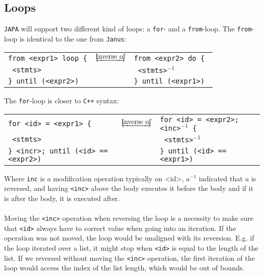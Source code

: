 \subsection{Loops}
\texttt{JAPA} will support two different kind of loops: a \texttt{for}- and a \texttt{from}-loop.
The \texttt{from}-loop is identical to the one from \texttt{Janus}:
\begin{table*}[H]
    \centering
    \begin{tabular}{lcl}
        \texttt{from <expr1> loop \{} & $\underleftrightarrow{\text{Inverse of}}$ & \texttt{from <expr2> do \{ }\\
        \texttt{ <stmts>} && \texttt{ <stmts>$^{-1}$} \\
        \texttt{\} until (<expr2>)} && \texttt{\} until (<expr1>)} 
    \end{tabular}
\end{table*}
\noindent
The \texttt{for}-loop is closer to \texttt{C++} syntax:

\begin{table*}[!h]
    \centering
    \begin{tabular}{lcl}
        \texttt{for <id> = <expr1> \{} & $\underleftrightarrow{\text{Inverse of}}$ & \texttt{for <id> = <expr2>; <inc>$^{-1}$ \{ }\\
        \texttt{ <stmts>} && \texttt{ <stmts>$^{-1}$} \\
        \texttt{\} <incr>; until (<id> == <expr2>)} && \texttt{\} until (<id> == <expr1>)} 
    \end{tabular}
\end{table*}
\noindent
Where \texttt{inc} is a modification operation typically on <id>, $a^{-1}$ indicated that
$a$ is reversed, and having \texttt{<inc>} above the body executes it before the body and
if it is after the body, it is executed after.
\\
\\
Moving the \texttt{<inc>} operation when reversing the loop is a necessity to make sure that
\texttt{<id>} always have to correct value when going into an iteration. If the operation was not
moved, the loop would be unaligned with its reversion. E.g. if the loop iterated over a list,
it might stop when \texttt{<id>} is equal to the length of the list. If we reversed without moving
the \texttt{<inc>} operation, the first iteration of the loop would access the index of the list
length, which would be out of bounds.

